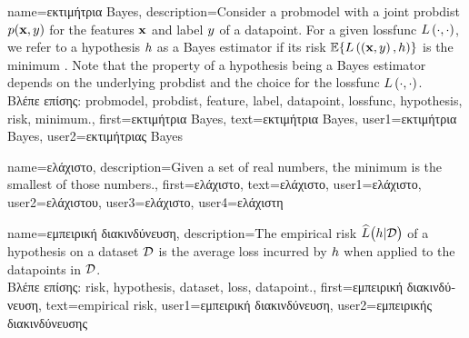{name={\foreignlanguage{greek}{εκτιμήτρια} Bayes},
	description={Consider 
		a \gls{probmodel} with a joint \gls{probdist} $p({\bf x},y)$ for the \gls{feature}s ${\bf x}$ and \gls{label} 
		$y$ of a \gls{datapoint}. For a given \gls{lossfunc} $L\left(\cdot,\cdot \right)$, we refer to a \gls{hypothesis} 
		$h$ as a Bayes estimator if its \gls{risk} $\mathbb{E}\{L\left(\left( {\bf x},y \right),h \right)\}$ is the 
		\gls{minimum} \cite{LC}. Note that the property of a \gls{hypothesis} being a Bayes estimator depends on 
		the underlying \gls{probdist} and the choice for the \gls{lossfunc} $L\left(\cdot,\cdot \right)$.\\
	\foreignlanguage{greek}{Βλέπε επίσης:} \gls{probmodel}, \gls{probdist}, \gls{feature}, \gls{label}, \gls{datapoint}, \gls{lossfunc}, \gls{hypothesis}, \gls{risk}, \gls{minimum}.},
		first={\foreignlanguage{greek}{εκτιμήτρια} Bayes},
		text={\foreignlanguage{greek}{εκτιμήτρια} Bayes},
		user1={\foreignlanguage{greek}{εκτιμήτρια} Bayes}, %
    		user2={\foreignlanguage{greek}{εκτιμήτριας} Bayes} %
}

{name={\foreignlanguage{greek}{ελάχιστο}},
	description={Given a set of real numbers, the minimum is the smallest of those numbers.},
	first={\foreignlanguage{greek}{ελάχιστο}},
	text={\foreignlanguage{greek}{ελάχιστο}},
	user1={\foreignlanguage{greek}{ελάχιστο}}, %
	user2={\foreignlanguage{greek}{ελάχιστου}}, %
	user3={\foreignlanguage{greek}{ελάχιστο}}, %
	user4={\foreignlanguage{greek}{ελάχιστη}} %
}

{name={\foreignlanguage{greek}{εμπειρική διακινδύνευση}},
  description={The empirical \gls{risk} $\widehat{L}\big(h|\mathcal{D}\big)$ 
  	of a \gls{hypothesis} on a \gls{dataset} $\mathcal{D}$ is the average \gls{loss} incurred 
  	by $h$ when applied to the \gls{datapoint}s in $\mathcal{D}$.\\
	\foreignlanguage{greek}{Βλέπε επίσης:} \gls{risk}, \gls{hypothesis}, \gls{dataset}, \gls{loss}, \gls{datapoint}.},
  first={\foreignlanguage{greek}{εμπειρική διακινδύνευση}},
  text={empirical risk},
  user1={\foreignlanguage{greek}{εμπειρική διακινδύνευση}}, %
  user2={\foreignlanguage{greek}{εμπειρικής διακινδύνευσης}} %
}

